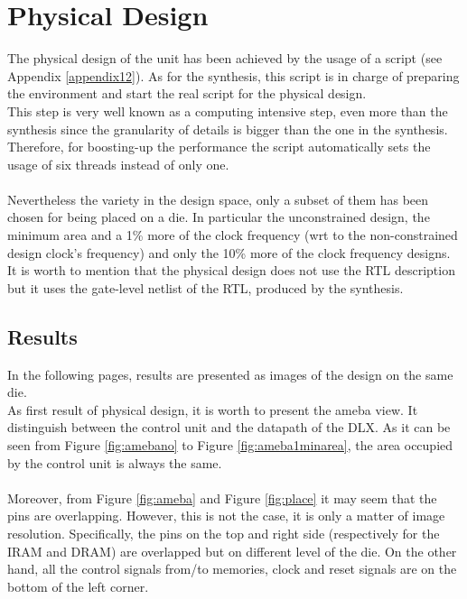 \chapter{Physical Design}
\label{pd}
The physical design of the unit has been achieved by the usage of a script (see Appendix \ref{appendix12}). As for the synthesis, this script is in charge of preparing the environment and start the real script for the physical design.\\ This step is very well known as a computing intensive step, even more than the synthesis since the granularity of details is bigger than the one in the synthesis. Therefore, for boosting-up the performance the script automatically sets the usage of six threads instead of only one.\\\\
Nevertheless the variety in the design space, only a subset of them has been chosen for being placed on a die. In particular the unconstrained design, the minimum area and a 1\% more of the clock frequency (wrt to the non-constrained design clock's frequency) and only the 10\% more of the clock frequency designs. It is worth to mention that the physical design does not use the RTL description but it uses the gate-level netlist of the RTL, produced by the synthesis.\\
\section{Results}
In the following pages, results are presented as images of the design on the same die.\\
As first result of physical design, it is worth to present the ameba view. It distinguish between the control unit and the datapath of the DLX. As it can be seen from Figure \ref{fig:amebano} to Figure \ref{fig:ameba1minarea}, the area occupied by the control unit is always the same.\\\\
Moreover, from Figure \ref{fig:ameba} and Figure \ref{fig:place} it may seem that the pins are overlapping. However, this is not the case, it is only a matter of image resolution. Specifically, the pins on the top and right side (respectively for the IRAM and DRAM) are overlapped but on different level of the die. On the other hand, all the control signals from/to memories, clock and reset signals are on the bottom of the left corner.\\\\


